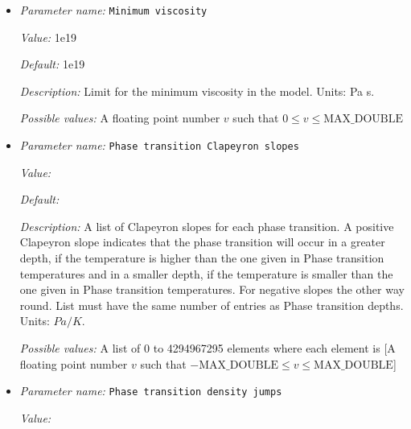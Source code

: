 \begin{itemize}
{\it Value:} 1e24


{\it Default:} 1e24


{\it Description:} Limit for the maximum viscosity in the model. Units: Pa s.


{\it Possible values:} A floating point number $v$ such that $0 \leq v \leq \text{MAX\_DOUBLE}$
\item {\it Parameter name:} {\tt Minimum viscosity}
\label{parameters:Material model/Latent heat/Minimum viscosity}


{\it Value:} 1e19


{\it Default:} 1e19


{\it Description:} Limit for the minimum viscosity in the model. Units: Pa s.


{\it Possible values:} A floating point number $v$ such that $0 \leq v \leq \text{MAX\_DOUBLE}$
\item {\it Parameter name:} {\tt Phase transition Clapeyron slopes}
\label{parameters:Material model/Latent heat/Phase transition Clapeyron slopes}


{\it Value:} 


{\it Default:} 


{\it Description:} A list of Clapeyron slopes for each phase transition. A positive Clapeyron slope indicates that the phase transition will occur in a greater depth, if the temperature is higher than the one given in Phase transition temperatures and in a smaller depth, if the temperature is smaller than the one given in Phase transition temperatures. For negative slopes the other way round. List must have the same number of entries as Phase transition depths. Units: $Pa/K$.


{\it Possible values:} A list of 0 to 4294967295 elements where each element is [A floating point number $v$ such that $-\text{MAX\_DOUBLE} \leq v \leq \text{MAX\_DOUBLE}$]
\item {\it Parameter name:} {\tt Phase transition density jumps}
\label{parameters:Material model/Latent heat/Phase transition density jumps}


{\it Value:} 



\end{itemize}
